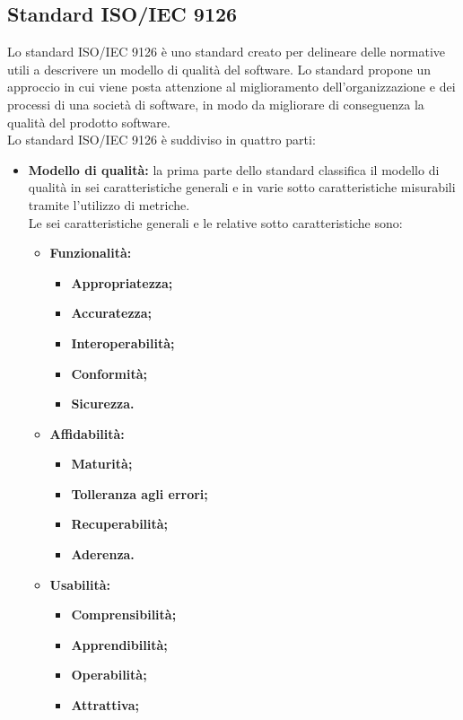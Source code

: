   	\subsection{Standard ISO/IEC 9126}
  	Lo standard ISO/IEC 9126 è uno standard creato per delineare delle normative utili a descrivere un modello di qualità del software. Lo standard propone un approccio in cui viene posta attenzione al miglioramento dell'organizzazione e dei processi di una società di software, in modo da migliorare di conseguenza la qualità del prodotto software.\\
  	Lo standard ISO/IEC 9126 è suddiviso in quattro parti:
		\begin{itemize}
			\item \textbf{Modello di qualità: } la prima parte dello standard classifica il modello di qualità in sei caratteristiche generali e in varie sotto caratteristiche misurabili tramite l'utilizzo di metriche.\\
			Le sei caratteristiche generali e le relative sotto caratteristiche sono:
				\begin{itemize}
					\item \textbf{Funzionalità:}
						\begin{itemize}
							\item \textbf{Appropriatezza;}
							\item \textbf{Accuratezza;}
							\item \textbf{Interoperabilità;}
							\item \textbf{Conformità;}
							\item \textbf{Sicurezza.}
						\end{itemize}
					\item \textbf{Affidabilità:}
						\begin{itemize}
							\item \textbf{Maturità;}
							\item \textbf{Tolleranza agli errori;}
							\item \textbf{Recuperabilità;}
							\item \textbf{Aderenza.}
						\end{itemize}
					\item \textbf{Usabilità:}
						\begin{itemize}
							\item \textbf{Comprensibilità;}
							\item \textbf{Apprendibilità;}
							\item \textbf{Operabilità;}
							\item \textbf{Attrattiva;}

\end{itemize}
\end{itemize}
\end{itemize}

